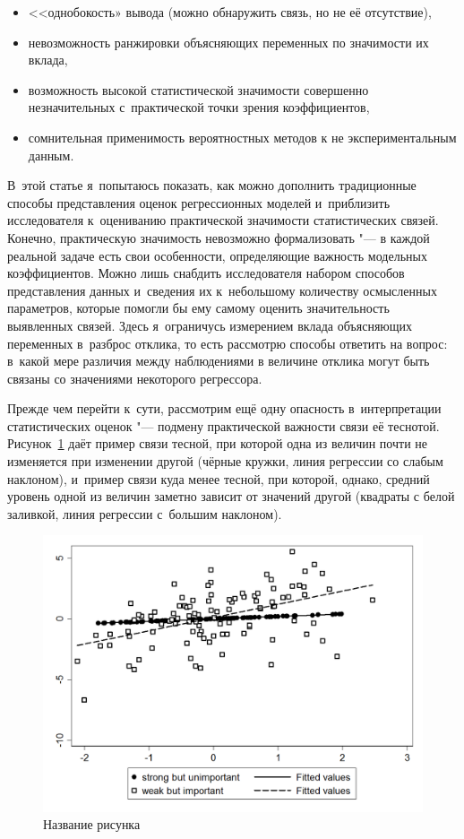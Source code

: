 \documentclass[11pt]{article}
\begin{document}
\begin{itemize}
	\item <<однобокость» вывода (можно обнаружить связь, но не её отсутствие), 
	\item невозможность ранжировки объясняющих переменных по значимости их вклада, 
	\item возможность высокой статистической значимости совершенно незначительных с~практической точки зрения коэффициентов,
	\item сомнительная применимость вероятностных методов к не экспериментальным данным.
\end{itemize}

В~этой статье я~попытаюсь показать, как можно дополнить традиционные способы представления оценок регрессионных моделей и~приблизить исследователя к~оцениванию практической значимости статистических связей. Конечно, практическую значимость невозможно формализовать "--- в каждой реальной задаче есть свои особенности, определяющие важность модельных коэффициентов. Можно лишь снабдить исследователя набором способов представления данных и~сведения их к~небольшому количеству осмысленных параметров, которые помогли бы ему самому оценить значительность выявленных связей. Здесь я~ограничусь измерением вклада объясняющих переменных в~разброс отклика, то есть рассмотрю способы ответить на вопрос: в~какой мере различия между наблюдениями в величине отклика могут быть связаны со значениями некоторого регрессора.

Прежде чем перейти к~сути, рассмотрим ещё одну опасность в~интерпретации статистических оценок "--- подмену практической важности связи её теснотой. Рисунок~\ref{fig:regression} даёт пример связи тесной, при которой одна из величин почти не изменяется при изменении другой (чёрные кружки, линия регрессии со слабым наклоном), и~пример связи куда менее тесной, при которой, однако, средний уровень одной из величин заметно зависит от значений другой (квадраты с белой заливкой, линия регрессии с~большим наклоном).

\begin{figure}[htbp]
	\centering
	\includegraphics[width=12cm]{regression.png}
	\caption{Название рисунка}\label{fig:regression}
\end{figure} 
\end{document}
